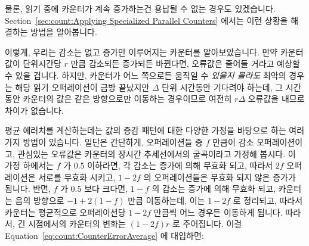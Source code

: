 {	물론, 읽기 중에 카운터가 계속 증가하는건 용납될 수 없는 경우도
	있겠습니다.
	Section~\ref{sec:count:Applying Specialized Parallel Counters}
	에서는 이런 상황을 해결하는 방법을 알아봅니다.

	이렇게, 우리는 감소는 없고 증가만 이루어지는 카운터를 알아보았습니다.
	만약 카운터 값이 단위시간당 $r$ 만큼 감소되든 증가되든 바뀐다면,
	오류값은 줄어들 거라고 예상할 수 있을 겁니다.
	하지만, 카운터가 어느 쪽으로든 움직일 수 \emph{있을지 몰라도} 최악의
	경우는 해당 읽기 오퍼레이션이 금방 끝났지만 $\Delta$ 단위 시간동안
	기다려야 하는데, 그 시간 동안 카운터의 값은 같은 방향으로만 이동하는
	경우이므로 여전히 $r \Delta$ 오류값을 내므로 차이가 없습니다.

	평균 에러치를 계산하는데는 값의 증감 패턴에 대한 다양한 가정을 바탕으로
	하는 여러가지 방법이 있습니다.
	일단은 간단하게, 오퍼레이션들 중 $f$ 만큼이 감소 오퍼레이션이고,
	관심있는 오류값은 카운터의 장시간 추세선에서의 굴곡이라고 가정해
	봅시다.
	이 가정 하에서는 $f$ 가 0.5 이하라면, 각 감소는 증가에 의해 무효화
	되고, 따라서 $2f$ 오퍼레이션은 서로를 무효화 시키고, $1-2f$ 의
	오퍼레이션들은 무효화 되지 않은 증가가 됩니다.
	반면, $f$ 가 0.5 보다 크다면, $1-f$ 의 감소는 증가에 의해 무효화 되고,
	카운터는 음의 방향으로 $-1+2\left(1-f\right)$ 만큼 이동하는데, 이는
	$1-2f$ 로 정리되고, 따라서 카운터는 평균적으로 오퍼레이션당 $1-2f$
	만큼씩 어느 경우든 이동하게 됩니다.
	따라서, 긴 시점에서의 카운터의 변화는 $\left( 1-2f \right) r$ 로
	주어집니다.
	이걸 Equation~\ref{eq:count:CounterErrorAverage} 에 대입하면:
	\iffalse

}
